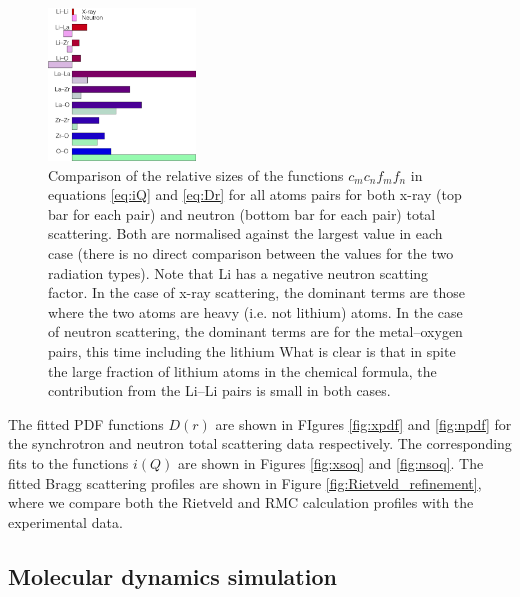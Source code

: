 \documentclass[twoside,twocolumn,9pt]{article}
\begin{document}
\begin{figure}[t]
\centering
\includegraphics[width=0.35\textwidth]{Pics/ccbb2.pdf}
\caption{Comparison of the relative sizes of the functions $c_m c_n f_m f_n$ in equations \ref{eq:iQ} and \ref{eq:Dr} for all atoms pairs for both x-ray (top bar for each pair) and neutron (bottom bar for each pair) total scattering. Both are normalised against the largest value in each case (there is no direct comparison between the values for the two radiation types). Note that Li has a negative neutron scatting factor. In the case of x-ray scattering, the dominant terms are those where the two atoms are heavy (i.e. not lithium) atoms. In the case of neutron scattering, the dominant terms are for the metal--oxygen pairs, this time including the lithium What is clear is that in spite the large fraction of lithium atoms in the chemical formula, the contribution from the Li--Li pairs is small in both cases.}
\label{fig:ccbb}
\end{figure}

The fitted PDF functions $D(r)$ are shown in FIgures \ref{fig:xpdf} and \ref{fig:npdf} for the synchrotron and neutron total scattering data respectively. The corresponding fits to the functions $i(Q)$ are shown in Figures \ref{fig:xsoq} and \ref{fig:nsoq}. The fitted Bragg scattering profiles are shown in Figure \ref{fig:Rietveld_refinement}, where we compare both the Rietveld and RMC calculation profiles with the experimental data.


\subsection{Molecular dynamics simulation}
\end{document}
